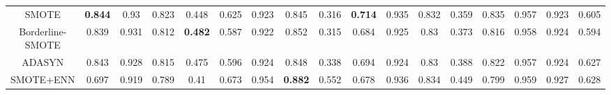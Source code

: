 \documentclass[runningheads]{llncs}
\begin{document}
\begin{table}[htbp]
{\begin{tabular}{@{}ccccccccccccccccc@{}}
        SMOTE                                           & \textbf{0.844}                   & 0.93                                         & 0.823                      & 0.448                         & 0.625                            & 0.923                                        & 0.845                      & 0.316                         & \textbf{0.714}                   & 0.935                                        & 0.832                      & 0.359                         & 0.835                            & 0.957                                        & 0.923                      & 0.605                         \\
        Borderline-SMOTE                                & 0.839                            & 0.931                                        & 0.812                      & \textbf{0.482}                & 0.587                            & 0.922                                        & 0.852                      & 0.315                         & 0.684                            & 0.925                                        & 0.83                       & 0.373                         & 0.816                            & 0.958                                        & 0.924                      & 0.594                         \\
        ADASYN                                          & 0.843                            & 0.928                                        & 0.815                      & 0.475                         & 0.596                            & 0.924                                        & 0.848                      & 0.338                         & 0.694                            & 0.924                                        & 0.83                       & 0.388                         & 0.822                            & 0.957                                        & 0.924                      & 0.627                         \\
        SMOTE+ENN                                       & 0.697                            & 0.919                                        & 0.789                      & 0.41                          & 0.673                            & 0.954                                        & \textbf{0.882}             & 0.552                         & 0.678                            & 0.936                                        & 0.834                      & 0.449                         & 0.799                            & 0.959                                        & 0.927                      & 0.628                         \\

\end{tabular}}
\end{table}
\end{document}
